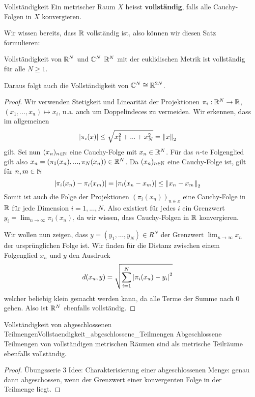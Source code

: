 \begin{definition}{Vollständigkeit}{}
Ein metrischer Raum $X$ heisst \textbf{vollständig}, falls alle Cauchy-Folgen in $X$ konvergieren.
\end{definition}
Wir wissen bereits, dass $\mathbb{R}$ vollständig ist, also können wir diesen Satz formulieren:
\begin{satz}{Vollständigkeit von $\mathbb{R}^N$ und $\mathbb{C}^N$}{}
$\mathbb{R}^N$ mit der euklidischen Metrik ist vollständig für alle $N \geq 1$.

Daraus folgt auch die Vollständigkeit von $\mathbb{C}^N \cong \mathbb{R}^{2N}$.
\end{satz}
\begin{proof} Wir verwenden Stetigkeit und Linearität der Projektionen $\pi_i: \mathbb{R}^N \to \mathbb{R}$, $(x_1, ..., x_n) \mapsto x_i$, u.a. auch um Doppelindeces zu vermeiden. Wir erkennen, dass im allgemeinen
$$\left|\pi_i(x)\right| \leq \sqrt{x_1^2+...+x_N^2} = \left\|x\right\|_2$$
gilt. Sei nun $(x_n)_{n \in \mathbb{N}}$ eine Cauchy-Folge mit $x_n \in \mathbb{R}^N$. Für das $n$-te Folgenglied gilt also $x_n = (\pi_1(x_n),..., \pi_N(x_n)) \in \mathbb{R}^N$. Da $(x_n)_{n \in \mathbb{N}}$ eine Cauchy-Folge ist, gilt für $n,m \in \mathbb{N}$
$$\left|\pi_i(x_n) - \pi_i(x_m)\right| = \left|\pi_i(x_n-x_m)\right| \leq \left\|x_n - x_m\right\|_2$$
Somit ist auch die Folge der Projektionen $(\pi_i(x_n))_{n \in x}$ eine Cauchy-Folge in $\mathbb{R}$ für jede Dimension $i = 1,...,N$. Also existiert für jedes $i$ ein Grenzwert $y_i = \lim_{n \to \infty} \pi_i(x_n)$, da wir wissen, dass Cauchy-Folgen in $\mathbb{R}$ konvergieren.

Wir wollen nun zeigen, dass $y = (y_1,...,y_N) \in R^N$ der Grenzwert $\lim_{n \to \infty}x_n$ der ursprünglichen Folge ist. Wir finden für die Distanz zwischen einem Folgenglied $x_n$ und $y$ den Ausdruck
$$d(x_n, y) = \sqrt{\sum_{i = 1}^N \left|\pi_i(x_n) - y_i\right|^2}$$
welcher beliebig klein gemacht werden kann, da alle Terme der Summe nach $0$ gehen. Also ist $\mathbb{R}^N$ ebenfalls vollständig.
\end{proof}
\begin{satz}{Vollständigkeit von abgeschlossenen Teilmengen}{Vollstaendigkeit_abgeschlossene_Teilmengen}
Abgeschlossene Teilmengen von vollständigen metrischen Räumen sind als metrische Teilräume ebenfalls vollständig.
\end{satz}
\begin{proof}
Übungsserie 3
Idee: Charakterisierung einer abgeschlossenen Menge: genau dann abgeschossen, wenn der Grenzwert einer konvergenten Folge in der Teilmenge liegt.
\end{proof}

